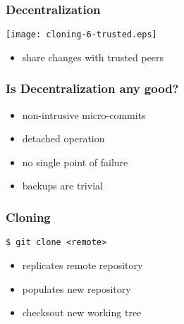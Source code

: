 \documentclass[english]{beamer}
\newcommand{\CMD}[1]{%
\texttt{\textcolor{code-green}{#1}}%
}
\newcommand{\green}[1]{%
\textcolor{code-green}{#1}%
}
\begin{document}
\begin{frame}
\frametitle{Decentralization}
\texttt{[image: cloning-6-trusted.eps]}
\begin{itemize}
        \item share changes with trusted peers
\end{itemize}
\end{frame}

\begin{frame}
\frametitle{Is Decentralization any good?}

\begin{itemize}
        \item non-intrusive micro-commits
        \item detached operation
        \item no single point of failure
        \item backups are trivial
\end{itemize}
\end{frame}

\begin{frame}
\frametitle{Cloning}

\CMD{\$ git clone <remote>} \\
\begin{itemize}
        \item replicates \green{remote} repository
        \item populates new repository
        \item checksout new working tree
\end{itemize}
\end{frame}
\end{document}
